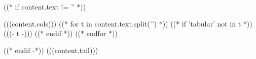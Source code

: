 ((* if content.text != '' *))
{\setlength\topsep{0pt}\setlength\parskip{0pt}\begin{center}
\begin{tabular}{(((content.cols)))} \hline
((* for t in content.text.split('\n') *))
((* if 'tabular' not in t *))
(((- t -)))
((* endif *))
((* endfor *))
\end{tabular}
\end{center}}
((* endif -*)) (((content.tail)))
\vspace{10pt}